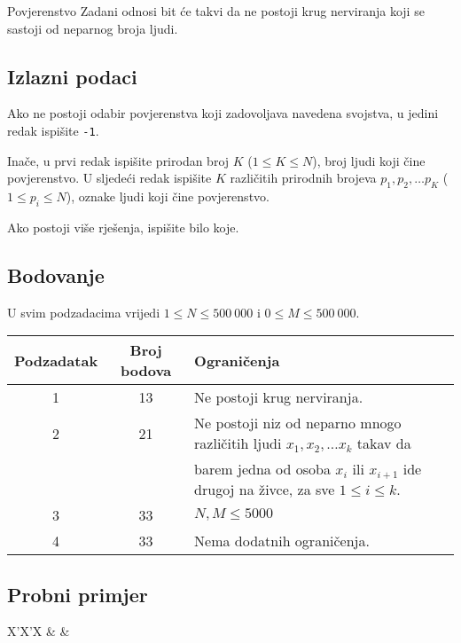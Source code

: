\begin{statement}[
  problempoints=100,
  timelimit=1 sekunda,
  memorylimit=512 MiB,
]{Povjerenstvo}
Zadani odnosi bit će takvi da ne postoji krug nerviranja koji se sastoji od
neparnog broja ljudi.

\subsection*{Izlazni podaci}

Ako ne postoji odabir povjerenstva koji zadovoljava navedena svojstva, u jedini
redak ispišite \texttt{-1}.

Inače, u prvi redak ispišite prirodan broj $K$ ($1 \leq K \leq N$), broj ljudi
koji čine povjerenstvo. U sljedeći redak ispišite $K$ različitih prirodnih
brojeva $p_1, p_2, \dots p_K$ ($1 \leq p_i \leq N$), oznake ljudi koji čine
povjerenstvo.

Ako postoji više rješenja, ispišite bilo koje.

\subsection*{Bodovanje}

U svim podzadacima vrijedi $1 \leq N \leq 500~000$ i $0 \leq M \leq 500~000$.

{\renewcommand{\arraystretch}{1.4}
  \setlength{\tabcolsep}{6pt}
  \begin{tabular}{ccl}
   Podzadatak & Broj bodova & Ograničenja \\ \midrule
    1 & 13 & Ne postoji krug nerviranja. \\
    2 & 21 & Ne postoji niz od neparno mnogo različitih ljudi $x_1, x_2, \dots x_k$ takav da \\
      &    & barem jedna od osoba $x_i$ ili $x_{i+1}$ ide drugoj na živce, za sve $1 \leq i \leq k$. \\
    3 & 33 & $N, M \leq 5000$ \\
    4 & 33 & Nema dodatnih ograničenja.
\end{tabular}}

\subsection*{Probni primjer}
\begin{tabularx}{\textwidth}{X'X'X}
 &
 &
\end{tabularx}


\end{statement}
